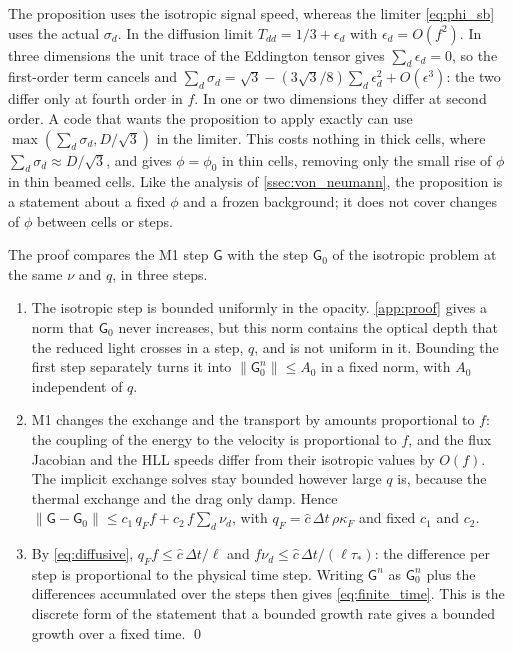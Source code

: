 \documentclass[preprint,12pt,authoryear]{elsarticle}
\newcommand{\tenG}{\mathsf{G}}
\begin{document}
\begin{appendix}
The proposition uses the isotropic signal speed, whereas the limiter \autoref{eq:phi_sb} uses the actual $\sigma_d$. In the diffusion limit $T_{dd} = 1/3 + \epsilon_d$ with $\epsilon_d = O(f^2)$. In three dimensions the unit trace of the Eddington tensor gives $\sum_d\epsilon_d = 0$, so the first-order term cancels and $\sum_d\sigma_d = \sqrt{3} - (3\sqrt{3}/8)\sum_d\epsilon_d^2 + O(\epsilon^3)$: the two differ only at fourth order in $f$. In one or two dimensions they differ at second order. A code that wants the proposition to apply exactly can use $\max(\sum_d\sigma_d, D/\sqrt{3})$ in the limiter. This costs nothing in thick cells, where $\sum_d\sigma_d \approx D/\sqrt{3}$, and gives $\phi = \phi_0$ in thin cells, removing only the small rise of $\phi$ in thin beamed cells. Like the analysis of \autoref{ssec:von_neumann}, the proposition is a statement about a fixed $\phi$ and a frozen background; it does not cover changes of $\phi$ between cells or steps.

\begin{pfm1}
The proof compares the M1 step $\tenG$ with the step $\tenG_0$ of the isotropic problem at the same $\nu$ and $q$, in three steps.
\begin{enumerate}
    \item The isotropic step is bounded uniformly in the opacity. \ref{app:proof} gives a norm that $\tenG_0$ never increases, but this norm contains the optical depth that the reduced light crosses in a step, $q$, and is not uniform in it. Bounding the first step separately turns it into $\|\tenG_0^n\| \leq A_0$ in a fixed norm, with $A_0$ independent of $q$.
    \item M1 changes the exchange and the transport by amounts proportional to $f$: the coupling of the energy to the velocity is proportional to $f$, and the flux Jacobian and the HLL speeds differ from their isotropic values by $O(f)$. The implicit exchange solves stay bounded however large $q$ is, because the thermal exchange and the drag only damp. Hence $\|\tenG - \tenG_0\| \leq c_1\,q_F f + c_2\,f\sum_d\nu_d$, with $q_F = \hat{c}\,\Delta t\,\rho\kappa_F$ and fixed $c_1$ and $c_2$.
    \item By \autoref{eq:diffusive}, $q_F f \leq \hat{c}\,\Delta t/\ell$ and $f\nu_d \leq \hat{c}\,\Delta t/(\ell\tau_*)$: the difference per step is proportional to the physical time step. Writing $\tenG^n$ as $\tenG_0^n$ plus the differences accumulated over the steps then gives \autoref{eq:finite_time}. This is the discrete form of the statement that a bounded growth rate gives a bounded growth over a fixed time. \qed
\end{enumerate}
\end{pfm1}


\end{appendix}
\end{document}
